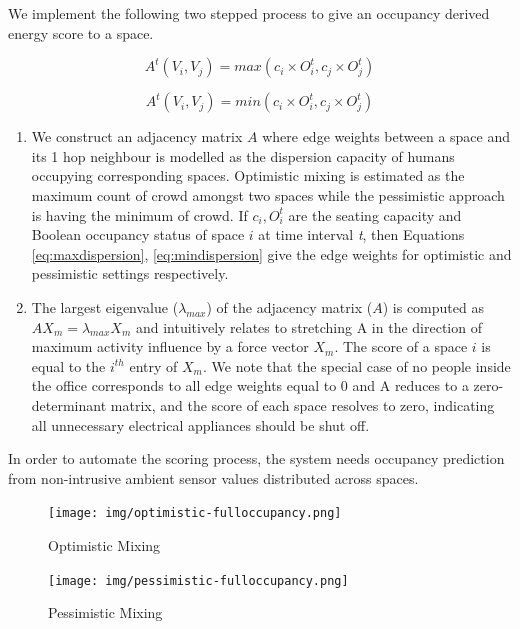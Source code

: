 We implement the following two stepped process to give an occupancy derived energy score to a space.  

\begin{equation}
    A^t(V_i,V_j) = max( c_i  \times O_i^t, c_j  \times O_j^t  )
    \label{eq:maxdispersion}
\end{equation}

\begin{equation}
    A^t(V_i,V_j) = min( c_i  \times O_i^t, c_j  \times O_j^t  )
    \label{eq:mindispersion}
\end{equation}

\begin{enumerate}
\item  We construct an adjacency matrix $A$ where edge weights between a space and its 1 hop neighbour is modelled as the dispersion capacity of humans occupying corresponding spaces. Optimistic mixing is estimated as the maximum count of crowd amongst two spaces while the pessimistic approach is having the minimum of crowd.  If $c_i, O_i^t$ are the seating capacity and Boolean occupancy status of space $i$ at time interval \textit{t}, then Equations \ref{eq:maxdispersion}, \ref{eq:mindispersion} give the edge weights for optimistic and pessimistic settings respectively. 

\item  The largest eigenvalue ($\lambda_{max}$) of the adjacency matrix ($A$) is computed as $A X_{m} = \lambda_{max} X_m$ and intuitively relates to stretching A in the direction of maximum activity influence by a force vector $X_m$. The score of a space $i$ is equal to the $i^{th}$ entry of $X_m$. We note that the special case of no people inside the office corresponds to all edge weights equal to 0 and A reduces to a zero-determinant matrix, and the score of each space resolves to zero, indicating all unnecessary electrical appliances should be shut off.   
\end{enumerate}


In order to automate the scoring process, the system needs occupancy prediction from non-intrusive ambient sensor values distributed across spaces. 



 \begin{figure}[h]
\centering
\texttt{[image: img/optimistic-fulloccupancy.png]}
\caption{Optimistic Mixing}\label{fig:optimistic-fulloccupancy}
\bigbreak
\texttt{[image: img/pessimistic-fulloccupancy.png]}
 \caption{Pessimistic Mixing}\label{fig:pessimistic-fulloccupancy}
\end{figure}



